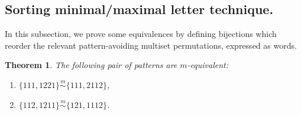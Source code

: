 \documentclass[11pt]{amsart}
\theoremstyle{plain}
\newtheorem{theorem}{Theorem}[section]
\theoremstyle{definition}
\newcommand{\msim}{\stackrel{m}{\sim}}
\begin{document}
\subsection{Sorting minimal/maximal letter technique.}

In this subsection, we prove some equivalences by defining bijections which reorder the relevant pattern-avoiding multiset permutations, expressed as words.

\begin{theorem}\label{teo1}
The following pair of patterns are $m$-equivalent:
\begin{enumerate}
\item $\{111,1221\}\msim\{111,2112\}$,
\item $\{112,1211\}\msim\{121,1112\}$.
\end{enumerate}
\end{theorem}
\end{document}
